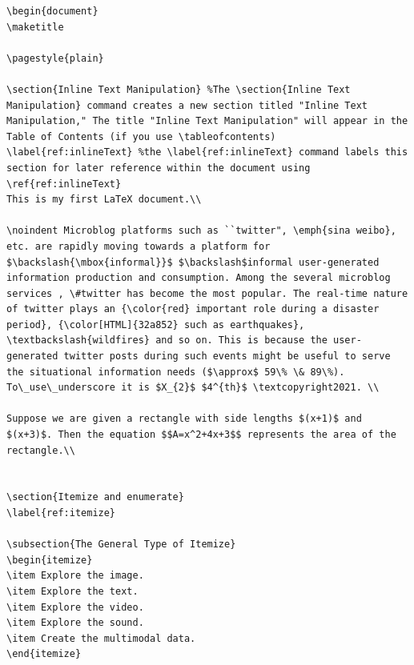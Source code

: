 \documentclass{article}
\begin{document}
\begin{lstlisting}
\begin{document}
\maketitle

\pagestyle{plain}

\section{Inline Text Manipulation} %The \section{Inline Text Manipulation} command creates a new section titled "Inline Text Manipulation," The title "Inline Text Manipulation" will appear in the Table of Contents (if you use \tableofcontents) 
\label{ref:inlineText} %the \label{ref:inlineText} command labels this section for later reference within the document using \ref{ref:inlineText}
This is my first LaTeX document.\\

\noindent Microblog platforms such as ``twitter", \emph{sina weibo}, etc. are rapidly moving towards a platform for $\backslash{\mbox{informal}}$ $\backslash$informal user-generated information production and consumption. Among the several microblog services , \#twitter has become the most popular. The real-time nature of twitter plays an {\color{red} important role during a disaster period}, {\color[HTML]{32a852} such as earthquakes}, \textbackslash{wildfires} and so on. This is because the user-generated twitter posts during such events might be useful to serve the situational information needs ($\approx$ 59\% \& 89\%). To\_use\_underscore it is $X_{2}$ $4^{th}$ \textcopyright2021. \\

Suppose we are given a rectangle with side lengths $(x+1)$ and $(x+3)$. Then the equation $$A=x^2+4x+3$$ represents the area of the rectangle.\\


\section{Itemize and enumerate}
\label{ref:itemize}

\subsection{The General Type of Itemize}
\begin{itemize}
\item Explore the image.
\item Explore the text.
\item Explore the video.
\item Explore the sound.
\item Create the multimodal data.
\end{itemize}


\end{lstlisting}
\end{document}
